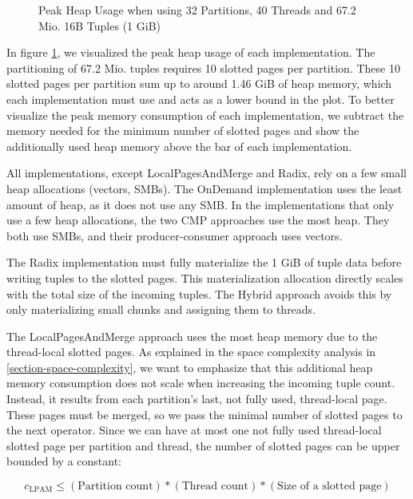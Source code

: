 \begin{figure}[h]
  \centering
  \resizebox{\linewidth}{!}{}
  \caption{Peak Heap Usage when using 32 Partitions, 40 Threads and 67.2 Mio.
    16B Tuples (1 GiB)} \label{plot-heap-16B-P32-Th40} \end{figure}
In figure \ref{plot-heap-16B-P32-Th40}, we visualized the peak heap usage of each implementation.
The partitioning of 67.2 Mio.
tuples requires 10 slotted pages per partition.
These 10 slotted pages per partition sum up to around 1.46 GiB of heap memory, which each implementation must use and acts as a lower bound in the plot.
To better visualize the peak memory consumption of each implementation, we subtract the memory needed for the minimum number of slotted pages and show the additionally used heap memory above the bar of each implementation.

All implementations, except LocalPagesAndMerge and Radix, rely on a few small heap allocations (vectors, SMBs).
The OnDemand implementation uses the least amount of heap, as it does not use any \ac{SMB}.
In the implementations that only use a few heap allocations, the two \ac{CMP} approaches use the most heap.
They both use \acp{SMB}, and their producer-consumer approach uses vectors.

The Radix implementation must fully materialize the 1 GiB of tuple data before writing tuples to the slotted pages.
This materialization allocation directly scales with the total size of the incoming tuples.
The Hybrid approach avoids this by only materializing small chunks and assigning them to threads.

The LocalPagesAndMerge approach uses the most heap memory due to the thread-local slotted pages.
As explained in the space complexity analysis in \ref{section-space-complexity}, we want to emphasize that this additional heap memory consumption does not scale when increasing the incoming tuple count.
Instead, it results from each partition's last, not fully used, thread-local page.
These pages must be merged, so we pass the minimal number of slotted pages to the next operator.
Since we can have at most one not fully used thread-local slotted page per partition and thread, the number of slotted pages can be upper bounded by a constant:

\begin{equation} c_\textrm{LPAM} \leq (\textrm{Partition count}) * (\textrm{Thread count}) * (\textrm{Size of a slotted page}) \end{equation}

